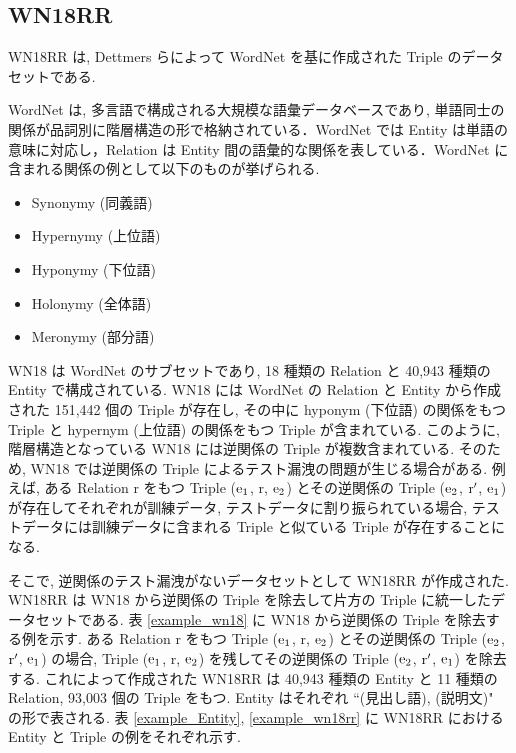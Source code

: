 \subsection{WN18RR}

WN18RR \cite{WN18RR_ConvE} は, Dettmers らによって WordNet \cite{Wordnet} を基に作成された Triple のデータセットである. \par
WordNet は, 多言語で構成される大規模な語彙データベースであり, 単語同士の関係が品詞別に階層構造の形で格納されている．WordNet では Entity は単語の意味に対応し，Relation は Entity 間の語彙的な関係を表している．WordNet に含まれる関係の例として以下のものが挙げられる. \par

\begin{itemize}
      \item Synonymy (同義語)
      \item Hypernymy (上位語)
      \item Hyponymy (下位語)
      \item Holonymy (全体語)
      \item Meronymy (部分語)
\end{itemize}

WN18 \cite{TransE_WN18} は WordNet のサブセットであり, 18 種類の Relation と 40,943 種類の Entity で構成されている. WN18 には WordNet の Relation と Entity から作成された 151,442 個の Triple が存在し, その中に hyponym (下位語) の関係をもつ Triple と hypernym (上位語) の関係をもつ Triple が含まれている. このように, 階層構造となっている WN18 には逆関係の Triple が複数含まれている. そのため, WN18 では逆関係の Triple によるテスト漏洩の問題が生じる場合がある. 例えば, ある Relation r をもつ Triple (${\rm e}_{1}$, r, ${\rm e}_{2}$) とその逆関係の Triple (${\rm e}_{2}$, ${\rm r}'$, ${\rm e}_{1}$) が存在してそれぞれが訓練データ, テストデータに割り振られている場合, テストデータには訓練データに含まれる Triple と似ている Triple が存在することになる. \par
そこで, 逆関係のテスト漏洩がないデータセットとして WN18RR が作成された. WN18RR は WN18 から逆関係の Triple を除去して片方の Triple に統一したデータセットである. 表 \ref{example_wn18} に WN18 から逆関係の Triple を除去する例を示す. ある Relation r をもつ Triple (${\rm e}_{1}$, r, ${\rm e}_{2}$) とその逆関係の Triple (${\rm e}_{2}$, ${\rm r}'$, ${\rm e}_{1}$) の場合, Triple (${\rm e}_{1}$, r, ${\rm e}_{2}$) を残してその逆関係の Triple (${\rm e}_{2}$, ${\rm r}'$, ${\rm e}_{1}$) を除去する. これによって作成された WN18RR は 40,943 種類の Entity と 11 種類の Relation, 93,003 個の Triple をもつ. Entity はそれぞれ ``(見出し語), (説明文)" の形で表される. 表 \ref{example_Entity}, \ref{example_wn18rr} に WN18RR における Entity と Triple の例をそれぞれ示す. \par

